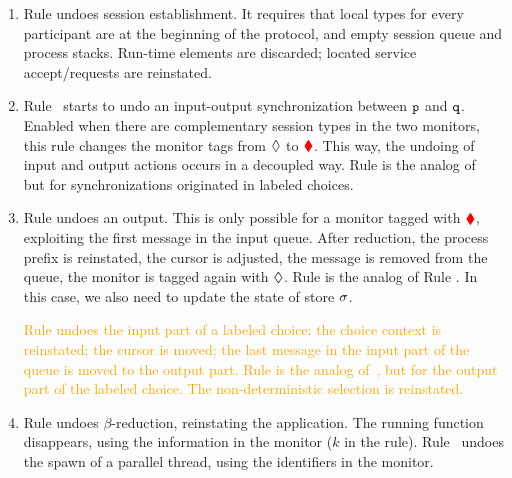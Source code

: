 \documentclass[runningheads]{llncs}
\newcommand{\erase}[1]{\textcolor{orange}{#1}}
\begin{document}
\begin{enumerate}[$\bkcolor{\blacktriangleleft}$]
\item Rule  undoes session establishment. It requires that local types for every participant are at the beginning of the protocol, and empty session queue and process stacks. Run-time elements are discarded; located service accept/requests are reinstated.

\item Rule~ starts to undo an input-output synchronization between $\mathtt{p}$ and $\mathtt{q}$. 
Enabled when there are complementary session types in the two monitors, this rule changes the monitor tags  from $\lozenge$ to $\textcolor{red}{\blacklozenge}$. %
This way, the undoing of input and output actions occurs in a decoupled way. 
Rule  is the analog of~ but for synchronizations originated in labeled choices.

\item Rule  undoes an output. This is only possible for a  monitor tagged with $\textcolor{red}{\blacklozenge}$, exploiting the first message in the input queue. After reduction, the process prefix is reinstated, the cursor is adjusted, the message is removed from the queue, 
the   monitor is tagged again with $\lozenge$.
Rule  is the analog of Rule . In this case, we also need to update the state of store $\sigma$. 

\erase{Rule  undoes the input part of a labeled choice: the choice context is reinstated; the cursor is moved; the last message in the input part of the queue is moved to the output part. 
Rule \bkcolor{\textsc{(RSel)}} is the analog of~\bkcolor{\textsc{(RBra)}}, but for the output part of the labeled choice. The non-deterministic   selection is reinstated.}

\item Rule  undoes $\beta$-reduction, reinstating the application. The running function disappears, using the information in the 
  monitor ($k$ in the rule).
Rule~ undoes the spawn of a parallel thread, using the identifiers in the  monitor. 
\end{enumerate}
\end{document}
